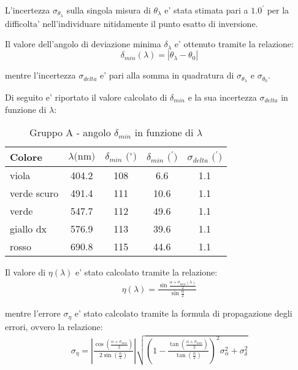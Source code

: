 L'incertezza $\sigma_{\theta_{\lambda}}$ sulla singola misura di $\theta_{\lambda}$ e' stata stimata pari a $1.0^{\prime}$ per la difficolta' nell'individuare nitidamente il punto esatto di inversione.

Il valore dell'angolo di deviazione minima $\delta_{\lambda}$ e' ottenuto tramite la relazione:
\[
    \delta_{min} (\lambda) = |\theta_{\lambda} - \theta_0|
\]

mentre l'incertezza $\sigma_{delta}$ e' pari alla somma in quadratura di $\sigma_{\theta_{\lambda}}$ e $\sigma_{\theta_0}$.

Di seguito e' riportato il valore calcolato di $\delta_{min}$ e la sua incertezza $\sigma_{delta}$ in funzione di $\lambda$:
\begin{table}[!htbp]
    {\par\centering
    \begin{tabular}{lcccc}
        \hline
            Colore&
            $\lambda \text{(nm)}$ & 
            $\delta_{min} \text{ ($^{\circ}$)}$ & 
            $\delta_{min} \text{ ($^{\prime}$)}$ & 
            $\sigma_{delta} \text{ ($^{\prime}$)}$\\
        \hline
            viola       &   404.2   &   108 &   6.6  & 1.1\\
            verde scuro &   491.4   &   111 &   10.6 & 1.1\\
            verde       &   547.7   &   112 &   49.6 & 1.1\\
            giallo dx   &   576.9   &   113 &   39.6 & 1.1\\
            rosso       &   690.8   &   115 &   44.6 & 1.1\\
        \hline
    \end{tabular}
    \par}
    \caption{Gruppo A - angolo $\delta_{min}$ in funzione di $\lambda$}
\end{table}

Il valore di $\eta (\lambda)$ e' stato calcolato tramite la relazione:
\begin{align}
    \eta (\lambda) = \frac{\sin{\frac{\alpha + \sigma_{min} (\lambda)}{2}}}{\sin{\frac{\alpha}{2}}}
\end{align}

mentre l'errore $\sigma_{\eta}$ e' stato calcolato tramite la formula di propagazione degli errori, ovvero la relazione:
\begin{align}
    \sigma_{\eta} = 
        \left|
            \frac{
                \cos{\left( \frac{\alpha + \sigma_{min}}{2} \right)}
            }{
                2 \sin{\left( \frac{\alpha}{2} \right)}
            }
        \right|
        \sqrt{
            \left(
                1-\frac{
                    \tan{\left(
                        \frac{\alpha + \sigma_{min}}{2}
                    \right)
                }}{
                \tan{\left(
                    \frac{\alpha}{2}
                \right)}}
            \right)^2 \sigma_{\alpha}^2 + \sigma_{\delta}^2}
\end{align}

